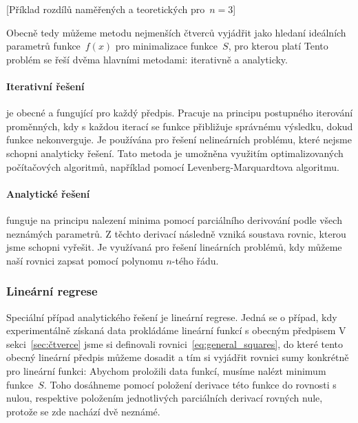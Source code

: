 [Příklad rozdílů naměřených a teoretických pro~$n=3$]

Obecně tedy můžeme metodu nejmenších čtverců vyjádřit jako hledaní ideálních 
parametrů funkce~$f(x)$ pro minimalizace funkce~$S$, pro kterou platí
Tento problém se řeší dvěma hlavními metodami: iterativně a analyticky.

\paragraph{Iterativní řešení} je obecné a fungující pro každý předpis. Pracuje
na principu postupného iterování proměnných, kdy s každou iterací se funkce
přibližuje správnému výsledku, dokud funkce nekonverguje. Je používána pro
řešení nelineárních problému, které nejsme schopni analyticky řešení. Tato
metoda je umožněna využitím optimalizovaných počítačových algoritmů, například
pomocí Levenberg-Marquardtova algoritmu.

\paragraph{Analytické řešení} funguje na principu nalezení minima pomocí
parciálního derivování podle všech neznámých parametrů. Z těchto derivací
následně vzniká soustava rovnic, kterou jsme schopni vyřešit. Je využívaná pro
řešení lineárních problémů, kdy můžeme naší rovnici zapsat pomocí polynomu
$n$-tého řádu.


\subsubsection{Lineární regrese}
Speciální případ analytického řešení je lineární regrese. Jedná se o případ,
kdy experimentálně získaná data prokládáme lineární funkcí s obecným předpisem
V sekci~\ref{sec:čtverce} jsme si definovali rovnici~\eqref{eq:general_squares},
do které tento obecný lineární předpis můžeme dosadit a tím si vyjádřit rovnici
sumy konkrétně pro lineární funkci:
Abychom proložili data funkcí, musíme nalézt minimum funkce~$S$. Toho dosáhneme
pomocí položení derivace této funkce do rovnosti s nulou, respektive položením
jednotlivých parciálních derivací rovných nule, protože se zde nachází dvě
neznámé.~\cite{wolfram} 

